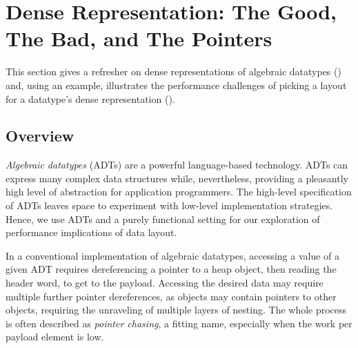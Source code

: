 \section[Dense Representation]{Dense Representation: The Good, The Bad, and The Pointers}%
\label{sec:overview}
\label{ssec:overview:dense}

This section gives a refresher on dense representations of algebraic datatypes ()
and, using an example, illustrates the performance challenges of picking a
layout for a datatype's dense representation ().

\subsection{Overview}%
\label{sec:overview:overview}

\emph{Algebraic datatypes} (ADTs) are a powerful language-based technology. ADTs can
express many complex data structures while, nevertheless, providing a
pleasantly high level of abstraction for application programmers.
The high-level specification of ADTs leaves
space to experiment with low-level implementation strategies. Hence, we use ADTs
and a purely functional setting for our exploration of performance implications of
data layout.

%
In a conventional implementation of algebraic datatypes, accessing a value of a
given ADT requires dereferencing a pointer to a heap object, then reading the
header word, to get to the payload.
Accessing the desired data may require multiple further pointer dereferences, as objects
may contain pointers to other objects, requiring the unraveling of multiple layers of nesting.
%
The whole process is often described as \emph{pointer chasing}, a fitting name, 
especially when the work per payload element is low.

